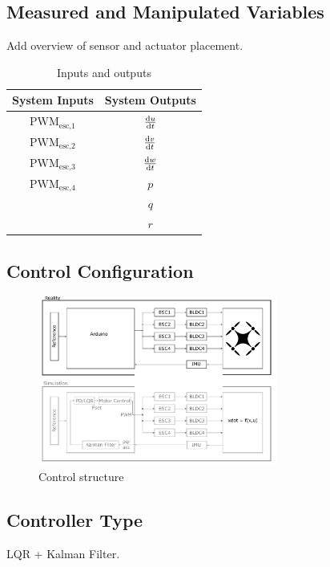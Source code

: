 \subsection{Measured and Manipulated Variables}
Add overview of sensor and actuator placement. 
\begin{table}[htb!]
	\centering
	\begin{tabular}{c@{\quad}|c@{\quad}}
		\hline
		\rule{0pt}{12pt} 
		System Inputs & System Outputs
		\\[2pt]
		\hline\rule{0pt}{12pt} 
		$\text{PWM}_\text{esc,1}$ & $\frac{\text{d}u}{\text{d}t}$ \\
		$\text{PWM}_\text{esc,2}$ & $\frac{\text{d}v}{\text{d}t}$ \\
		$\text{PWM}_\text{esc,3}$ & $\frac{\text{d}w}{\text{d}t}$ \\
		$\text{PWM}_\text{esc,4}$ & $p$ \\
		& $q$ \\
		& $r$ \\
		\hline
	\end{tabular}
	\vspace{6mm}
	\caption{Inputs and outputs} 
	\label{tab:mdl_gcai_paramSim}
\end{table}
\clearpage

\subsection{Control Configuration}
\begin{figure}[htb!]
	\centering
	\includegraphics[width=0.7\textwidth]{01_figures/controlStructure}
	\caption{Control structure}
	\label{fig:controlStructure}
\end{figure}
\clearpage
\clearpage

\subsection{Controller Type}
LQR + Kalman Filter.
\clearpage

